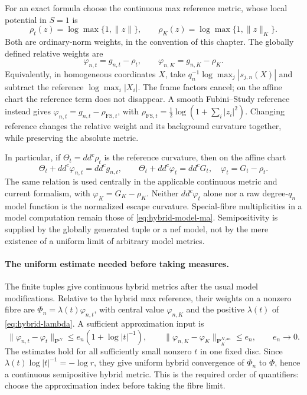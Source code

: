For an exact formula choose the continuous max reference metric,
whose local potential in $S=1$ is
\[
 \rho_t(z)=\log\max\{1,\|z\|\},\qquad
 \rho_K(z)=\log\max\{1,\|z\|_K\}.
\tag{66.29d}\label{eq:hybrid-escape-reference}
\]
Both are ordinary-norm weights, in the convention of this chapter.
The globally defined relative weights are
\[
 \varphi_{n,t}=g_{n,t}-\rho_t,\qquad
 \varphi_{n,K}=g_{n,K}-\rho_K.
\tag{66.29e}\label{eq:hybrid-escape-relative-weight}
\]
Equivalently, in homogeneous coordinates $X$, take
$q_n^{-1}\log\max_j|s_{j,n}(X)|$ and subtract the reference
$\log\max_i|X_i|$.
The frame factors cancel; on the affine chart the reference term
does not disappear. A smooth Fubini--Study reference instead gives
$\varphi_{n,t}=g_{n,t}-\rho_{\mathrm{FS},t}$, with
$\rho_{\mathrm{FS},t}=\tfrac12\log(1+\sum_i|z_i|^2)$.
Changing reference changes the relative weight and its background
curvature together, while preserving the absolute metric.

In particular, if $\Theta_t=dd^c\rho_t$ is the reference curvature,
then on the affine chart
\[
 \Theta_t+dd^c\varphi_{n,t}=dd^c g_{n,t},\qquad
 \Theta_t+dd^c\varphi_t=dd^c G_t,
 \quad \varphi_t=G_t-\rho_t.
\tag{66.29f}\label{eq:hybrid-escape-curvature-reference}
\]
The same relation is used centrally in the applicable continuous
metric and current formalism, with $\varphi_K=G_K-\rho_K$.
Neither $dd^c\varphi_t$ alone nor
a raw degree-$q_n$ model function is the normalized escape curvature.
Special-fibre multiplicities in a model computation remain those of
\eqref{eq:hybrid-model-ma}. Semipositivity is supplied by the
globally generated tuple or a nef model, not by the mere existence
of a uniform limit of arbitrary model metrics.

\paragraph{The uniform estimate needed before taking measures.}
The finite tuples give continuous hybrid metrics after the usual
model modifications. Relative to the hybrid max reference, their
weights on a nonzero fibre are
$\Phi_n=\lambda(t)\varphi_{n,t}$, with central value
$\varphi_{n,K}$ and the positive $\lambda(t)$ of
\eqref{eq:hybrid-lambda}. A sufficient approximation input is
\[
 \|\varphi_{n,t}-\varphi_t\|_{\mathbf P^N}
       \leq e_n(1+\log|t|^{-1}),\qquad
 \|\varphi_{n,K}-\varphi_K\|_{\mathbf P^{N,\mathrm{an}}_K}
       \leq e_n,\qquad e_n\longrightarrow0.
\tag{66.29g}\label{eq:hybrid-escape-uniformity-input}
\]
The estimates hold for all sufficiently small nonzero $t$ in one
fixed disc. Since $\lambda(t)\log|t|^{-1}=-\log r$, they give
uniform hybrid convergence of $\Phi_n$ to $\Phi$, hence a continuous
semipositive hybrid metric. This is the required order of quantifiers:
choose the approximation index before taking the fibre limit.

